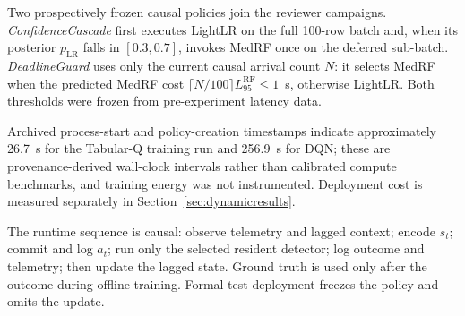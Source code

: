 Two prospectively frozen causal policies join the reviewer campaigns. \emph{ConfidenceCascade} first executes LightLR on the full 100-row batch and, when its posterior $p_{\text{LR}}$ falls in $[0.3,0.7]$, invokes MedRF once on the deferred sub-batch. \emph{DeadlineGuard} uses only the current causal arrival count $N$: it selects MedRF when the predicted MedRF cost $\lceil N/100\rceil L_{95}^{\text{RF}}\le 1$~s, otherwise LightLR. Both thresholds were frozen from pre-experiment latency data.

Archived process-start and policy-creation timestamps indicate approximately 26.7~s for the Tabular-Q training run and 256.9~s for DQN; these are provenance-derived wall-clock intervals rather than calibrated compute benchmarks, and training energy was not instrumented. Deployment cost is measured separately in Section~\ref{sec:dynamicresults}.

The runtime sequence is causal: observe telemetry and lagged context; encode $s_t$; commit and log $a_t$; run only the selected resident detector; log outcome and telemetry; then update the lagged state. Ground truth is used only after the outcome during offline training. Formal test deployment freezes the policy and omits the update.
